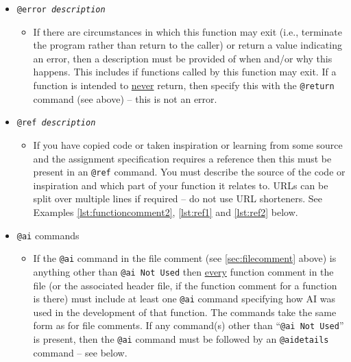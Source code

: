 \documentclass{article}
\newcommand{\llabel}[1]{\hypertarget{llineno:#1}{\linelabel{#1}}}
\begin{document}
\begin{itemize}[label={}]
\item \texttt{@error \textit{description}}
    \begin{itemize}[label={}]
    \item If there are circumstances in which this function may exit (i.e., terminate the program rather than  return to the caller) or return a value indicating an error, then a description must be provided of when and/or why this happens. This includes if functions called by this function may exit. If a function is intended to \underline{never} return, then specify this with the \texttt{@return} command (see above) -- this is not an error. 
    \end{itemize}
    
\item \texttt{@ref \textit{description}}
    \begin{itemize}[label={}]
    \item If you have copied code or taken inspiration or learning from some source and the assignment specification requires a reference then this must be present in an \texttt{@ref} command. You must describe the source of the code or inspiration and which part of your function it relates to. URLs can be split over multiple lines if required -- do not use URL shorteners. See Examples \ref{lst:functioncomment2}, \ref{lst:ref1} and \ref{lst:ref2} below.
    \end{itemize}

\item \texttt{@ai} commands\llabel{line:aistart}\label{aistart}
\begin{itemize}[label={}]
\item If the \texttt{@ai} command in the file comment (see \autoref{sec:filecomment} above) is anything other than \texttt{@ai Not Used} then \underline{every} function comment in the file (or the associated header file, if the function comment for a function is there) must include at least one \texttt{@ai} command specifying how AI was used in the development of that function. The commands take the same form as for file comments. If any command(s) other than ``\texttt{@ai Not Used}'' is present, then the \texttt{@ai} command must
be followed by an \texttt{@aidetails} command -- see below.


\end{itemize}
\end{itemize}
\end{document}
